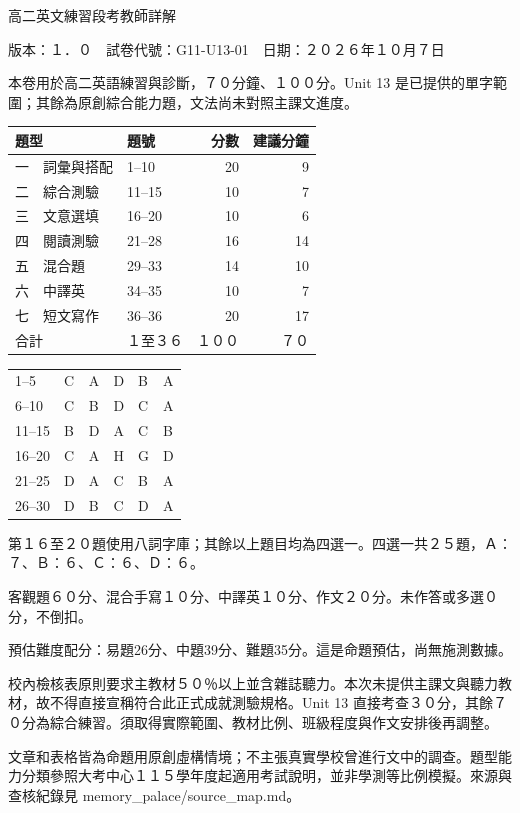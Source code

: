\documentclass[11pt,a4paper]{article}
\newcommand{\smallheading}[1]{\par\vspace{6pt}{\large\bfseries #1}\par\smallskip}
\begin{document}
\begin{center}{\LARGE 高二英文練習段考教師詳解}\end{center}
版本：１．０　試卷代號：G11-U13-01　日期：２０２６年１０月７日
\par\smallskip
本卷用於高二英語練習與診斷，７０分鐘、１００分。Unit 13 是已提供的單字範圍；其餘為原創綜合能力題，文法尚未對照主課文進度。
\par\smallskip
\smallheading{命題藍圖}
\begin{tabularx}{\linewidth}{lXrr}\hline
題型 & 題號 & 分數 & 建議分鐘 \\ \hline
一　詞彙與搭配 & 1--10 & 20 & 9 \\ 
二　綜合測驗 & 11--15 & 10 & 7 \\ 
三　文意選填 & 16--20 & 10 & 6 \\ 
四　閱讀測驗 & 21--28 & 16 & 14 \\ 
五　混合題 & 29--33 & 14 & 10 \\ 
六　中譯英 & 34--35 & 10 & 7 \\ 
七　短文寫作 & 36--36 & 20 & 17 \\ 
合計 & １至３６ & １００ & ７０ \\ \hline\end{tabularx}
\smallheading{客觀題答案}
\begin{tabularx}{\linewidth}{lXXXXX}\hline
1--5 & C & A & D & B & A\\
6--10 & C & B & D & C & A\\
11--15 & B & D & A & C & B\\
16--20 & C & A & H & G & D\\
21--25 & D & A & C & B & A\\
26--30 & D & B & C & D & A\\
\hline\end{tabularx}
第１６至２０題使用八詞字庫；其餘以上題目均為四選一。四選一共２５題，Ａ：７、Ｂ：６、Ｃ：６、Ｄ：６。
\par\smallskip
客觀題６０分、混合手寫１０分、中譯英１０分、作文２０分。未作答或多選０分，不倒扣。
\par\smallskip
預估難度配分：易題26分、中題39分、難題35分。這是命題預估，尚無施測數據。
\par\smallskip
\smallheading{正式段考使用前}
校內檢核表原則要求主教材５０％以上並含雜誌聽力。本次未提供主課文與聽力教材，故不得直接宣稱符合此正式成就測驗規格。Unit 13 直接考查３０分，其餘７０分為綜合練習。須取得實際範圍、教材比例、班級程度與作文安排後再調整。
\par\smallskip
文章和表格皆為命題用原創虛構情境；不主張真實學校曾進行文中的調查。題型能力分類參照大考中心１１５學年度起適用考試說明，並非學測等比例模擬。來源與查核紀錄見 memory\_palace/source\_map.md。
\par\smallskip
\end{document}
